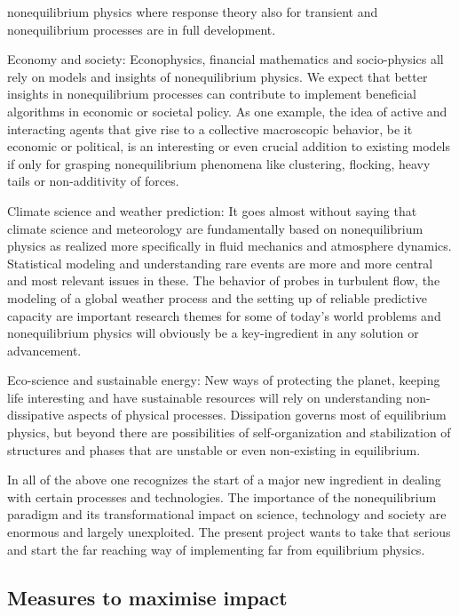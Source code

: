 \begin{compactitem}
  nonequilibrium physics where response theory also for transient and nonequilibrium
  processes are in full development.
\item Economy and society: Econophysics, financial mathematics and socio-physics all rely on
  models and insights of nonequilibrium physics. We expect that better insights in
  nonequilibrium processes can contribute to implement beneficial algorithms in economic or
  societal policy.  As one example, the idea of active and interacting agents that give rise
  to a collective macroscopic behavior, be it economic or political, is an interesting or
  even crucial addition to existing models if only for grasping nonequilibrium phenomena
  like clustering, flocking, heavy tails or non-additivity of forces.
\item Climate science and weather prediction: It goes almost without saying that climate
  science and meteorology are fundamentally based on nonequilibrium physics as realized more
  specifically in fluid mechanics and atmosphere dynamics. Statistical modeling and
  understanding rare events are more and more central and most relevant issues in these. The
  behavior of probes in turbulent flow, the modeling of a global weather process and the
  setting up of reliable predictive capacity are important research themes for some of
  today's world problems and nonequilibrium physics will obviously be a key-ingredient in
  any solution or advancement.
\item Eco-science and sustainable energy: New ways of protecting the planet, keeping life
  interesting and have sustainable resources will rely on understanding non-dissipative
  aspects of physical processes.  Dissipation governs most of equilibrium physics, but
  beyond there are possibilities of self-organization and stabilization of structures and
  phases that are unstable or even non-existing in equilibrium.
\end{compactitem}
In all of the above one recognizes the start of a major new ingredient in dealing with
certain processes and technologies. The importance of the nonequilibrium paradigm and its
transformational impact on science, technology and society are enormous and largely
unexploited. The present project wants to take that serious and start the far reaching way
of implementing far from equilibrium physics.

\subsection{Measures to maximise impact}

